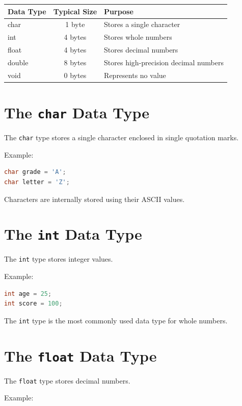 \documentclass[12pt,openany]{book}
\begin{document}
\begin{center}
\begin{tabular}{|l|c|l|}
\hline
\textbf{Data Type} & \textbf{Typical Size} & \textbf{Purpose} \\
\hline
char & 1 byte & Stores a single character \\
\hline
int & 4 bytes & Stores whole numbers \\
\hline
float & 4 bytes & Stores decimal numbers \\
\hline
double & 8 bytes & Stores high-precision decimal numbers \\
\hline
void & 0 bytes & Represents no value \\
\hline
\end{tabular}
\end{center}

\section{The \texttt{char} Data Type}

The \texttt{char} type stores a single character enclosed in single quotation marks.

Example:

\begin{lstlisting}[language=C]
char grade = 'A';
char letter = 'Z';
\end{lstlisting}

Characters are internally stored using their ASCII values.

\section{The \texttt{int} Data Type}

The \texttt{int} type stores integer values.

Example:

\begin{lstlisting}[language=C]
int age = 25;
int score = 100;
\end{lstlisting}

The \texttt{int} type is the most commonly used data type for whole numbers.

\section{The \texttt{float} Data Type}

The \texttt{float} type stores decimal numbers.

Example:
\end{document}
